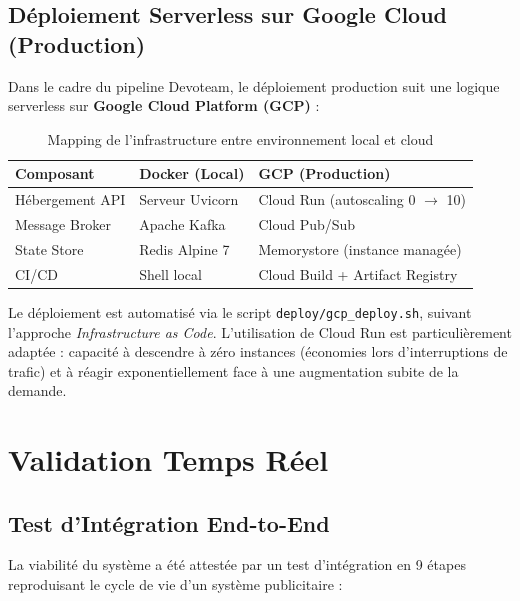 \subsection{Déploiement Serverless sur Google Cloud (Production)}

Dans le cadre du pipeline Devoteam, le déploiement production suit une logique serverless sur \textbf{Google Cloud Platform (GCP)} :

\begin{table}
    
    \begin{tabular}{l l l}
        \hline
        \textbf{Composant} & \textbf{Docker (Local)} & \textbf{GCP (Production)} \\
        \hline
        Hébergement API & Serveur Uvicorn & Cloud Run (autoscaling 0 $\to$ 10) \\
        Message Broker  & Apache Kafka    & Cloud Pub/Sub \\
        State Store     & Redis Alpine 7  & Memorystore (instance managée) \\
        CI/CD           & Shell local     & Cloud Build + Artifact Registry \\
        \hline
    \end{tabular}
    \caption{Mapping de l'infrastructure entre environnement local et cloud}
    \label{tab:mapping_infra}
\end{table}

Le déploiement est automatisé via le script \texttt{deploy/gcp\_deploy.sh}, suivant l'approche \textit{Infrastructure as Code}. L'utilisation de Cloud Run est particulièrement adaptée : capacité à descendre à zéro instances (économies lors d'interruptions de trafic) et à réagir exponentiellement face à une augmentation subite de la demande.


\section{Validation Temps Réel}
\label{sec:validation_temps_reel}

\subsection{Test d'Intégration End-to-End}

La viabilité du système a été attestée par un test d'intégration en 9 étapes reproduisant le cycle de vie d'un système publicitaire :

